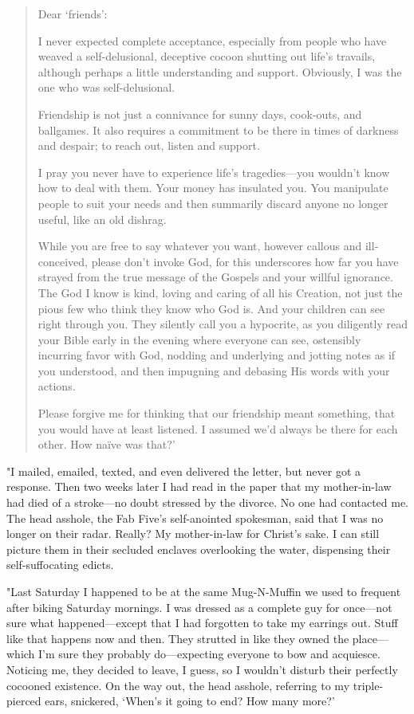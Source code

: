 \begin{quote}
Dear `friends':

I never expected complete acceptance, especially from people who have
weaved a self-delusional, deceptive cocoon shutting out life's travails,
although perhaps a little understanding and support. Obviously, I was
the one who was self-delusional.

Friendship is not just a connivance for sunny days, cook-outs, and
ballgames. It also requires a commitment to be there in times of
darkness and despair; to reach out, listen and support.

I pray you never have to experience life's tragedies---you wouldn't know
how to deal with them. Your money has insulated you. You manipulate
people to suit your needs and then summarily discard anyone no longer
useful, like an old dishrag.

While you are free to say whatever you want, however callous and
ill-conceived, please don't invoke God, for this underscores how far you
have strayed from the true message of the Gospels and your willful
ignorance. The God I know is kind, loving and caring of all his
Creation, not just the pious few who think they know who God is. And
your children can see right through you. They silently call you a
hypocrite, as you diligently read your Bible early in the evening where
everyone can see, ostensibly incurring favor with God, nodding and
underlying and jotting notes as if you understood, and then impugning
and debasing His words with your actions.

Please forgive me for thinking that our friendship meant something, that
you would have at least listened. I assumed we'd always be there for
each other. How naïve was that?'
\end{quote}

\noindent "I mailed, emailed, texted, and even delivered the letter, but
never got a response. Then two weeks later I had read in the paper that
my mother-in-law had died of a stroke---no doubt stressed by the
divorce. No one had contacted me. The head asshole, the Fab Five's
self-anointed spokesman, said that I was no longer on their radar.
Really? My mother-in-law for Christ's sake. I can still picture them in
their secluded enclaves overlooking the water, dispensing their
self-suffocating edicts.

"Last Saturday I happened to be at the same Mug-N-Muffin we used to
frequent after biking Saturday mornings. I was dressed as a complete guy
for once---not sure what happened---except that I had forgotten to take
my earrings out. Stuff like that happens now and then. They strutted in
like they owned the place---which I'm sure they probably do---expecting
everyone to bow and acquiesce. Noticing me, they decided to leave, I
guess, so I wouldn't disturb their perfectly cocooned existence. On the
way out, the head asshole, referring to my triple-pierced ears,
snickered, `When's it going to end? How many more?'

